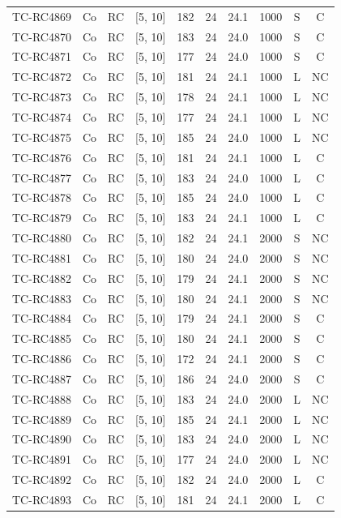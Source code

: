 \begin{longtable}{lccccccccc}
TC-RC4869 & Co & RC & [5, 10] & 182 & 24 & 24.1 & 1000 & S & C \\
TC-RC4870 & Co & RC & [5, 10] & 183 & 24 & 24.0 & 1000 & S & C \\
TC-RC4871 & Co & RC & [5, 10] & 177 & 24 & 24.0 & 1000 & S & C \\
TC-RC4872 & Co & RC & [5, 10] & 181 & 24 & 24.1 & 1000 & L & NC \\
TC-RC4873 & Co & RC & [5, 10] & 178 & 24 & 24.1 & 1000 & L & NC \\
TC-RC4874 & Co & RC & [5, 10] & 177 & 24 & 24.1 & 1000 & L & NC \\
TC-RC4875 & Co & RC & [5, 10] & 185 & 24 & 24.0 & 1000 & L & NC \\
TC-RC4876 & Co & RC & [5, 10] & 181 & 24 & 24.1 & 1000 & L & C \\
TC-RC4877 & Co & RC & [5, 10] & 183 & 24 & 24.0 & 1000 & L & C \\
TC-RC4878 & Co & RC & [5, 10] & 185 & 24 & 24.0 & 1000 & L & C \\
TC-RC4879 & Co & RC & [5, 10] & 183 & 24 & 24.1 & 1000 & L & C \\
TC-RC4880 & Co & RC & [5, 10] & 182 & 24 & 24.1 & 2000 & S & NC \\
TC-RC4881 & Co & RC & [5, 10] & 180 & 24 & 24.0 & 2000 & S & NC \\
TC-RC4882 & Co & RC & [5, 10] & 179 & 24 & 24.1 & 2000 & S & NC \\
TC-RC4883 & Co & RC & [5, 10] & 180 & 24 & 24.1 & 2000 & S & NC \\
TC-RC4884 & Co & RC & [5, 10] & 179 & 24 & 24.1 & 2000 & S & C \\
TC-RC4885 & Co & RC & [5, 10] & 180 & 24 & 24.1 & 2000 & S & C \\
TC-RC4886 & Co & RC & [5, 10] & 172 & 24 & 24.1 & 2000 & S & C \\
TC-RC4887 & Co & RC & [5, 10] & 186 & 24 & 24.0 & 2000 & S & C \\
TC-RC4888 & Co & RC & [5, 10] & 183 & 24 & 24.0 & 2000 & L & NC \\
TC-RC4889 & Co & RC & [5, 10] & 185 & 24 & 24.1 & 2000 & L & NC \\
TC-RC4890 & Co & RC & [5, 10] & 183 & 24 & 24.0 & 2000 & L & NC \\
TC-RC4891 & Co & RC & [5, 10] & 177 & 24 & 24.0 & 2000 & L & NC \\
TC-RC4892 & Co & RC & [5, 10] & 182 & 24 & 24.0 & 2000 & L & C \\
TC-RC4893 & Co & RC & [5, 10] & 181 & 24 & 24.1 & 2000 & L & C \\

\end{longtable}
